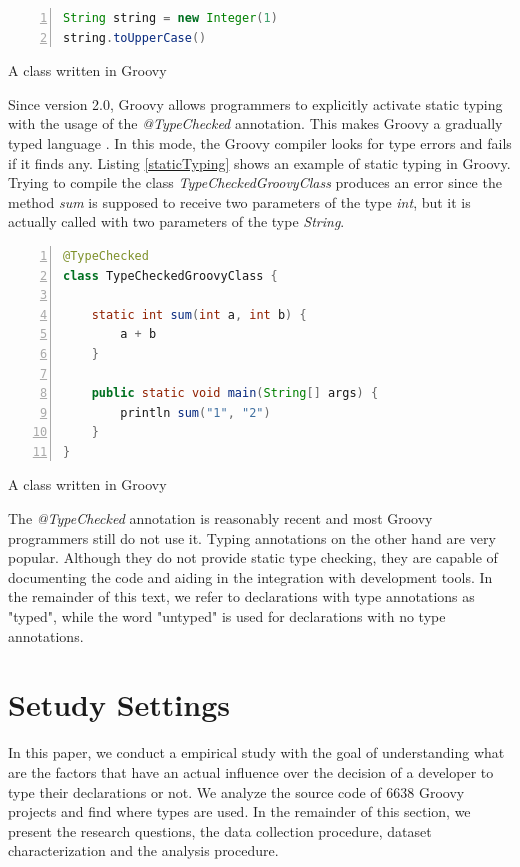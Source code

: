 \documentclass[preprint]{sigplanconf}
\begin{document}
\begin{Listing}[ht]
\begin{lstlisting}[language=Java,tabsize=2,breaklines=true,numbers=left]
String string = new Integer(1)
string.toUpperCase()
\end{lstlisting}
\caption{A class written in Groovy}
\label{typeError}
\end{Listing}

Since version 2.0, Groovy allows programmers to explicitly activate static typing with the usage of the \emph{@TypeChecked} annotation.
This makes Groovy a gradually typed language \cite{gray05,gray08,gray11,siek07,takikawa12}.
In this mode, the Groovy compiler looks for type errors and fails if it finds any.
Listing \ref{staticTyping} shows an example of static typing in Groovy.
Trying to compile the class \emph{TypeCheckedGroovyClass} produces an error since the method \emph{sum} is supposed to receive two parameters of the type \emph{int}, but it is actually called with two parameters of the type \emph{String}.

\begin{Listing}[ht]
\begin{lstlisting}[language=Java,tabsize=2,breaklines=true,numbers=left]
@TypeChecked
class TypeCheckedGroovyClass {
	
	static int sum(int a, int b) {
		a + b
	}

	public static void main(String[] args) {
		println sum("1", "2")
	}
}
\end{lstlisting}
\caption{A class written in Groovy}
\label{staticTyping}
\end{Listing}

The \emph{@TypeChecked} annotation is reasonably recent and most Groovy programmers still do not use it. 
Typing annotations on the other hand are very popular.
Although they do not provide static type checking, they are capable of documenting the code and aiding in the integration with development tools.
In the remainder of this text, we refer to declarations with type annotations as "typed", while the word "untyped" is used for declarations with no type annotations.







%
%

\section{Setudy Settings\label{settings}}
In this paper, we conduct a empirical study with the goal of understanding what are the factors that have an actual influence over the decision of a developer to type their declarations or not. 
We analyze the source code of 6638 Groovy projects and find where types are used.
In the remainder of this section, we present the research questions, the data collection procedure, dataset characterization and the analysis procedure.
\end{document}
